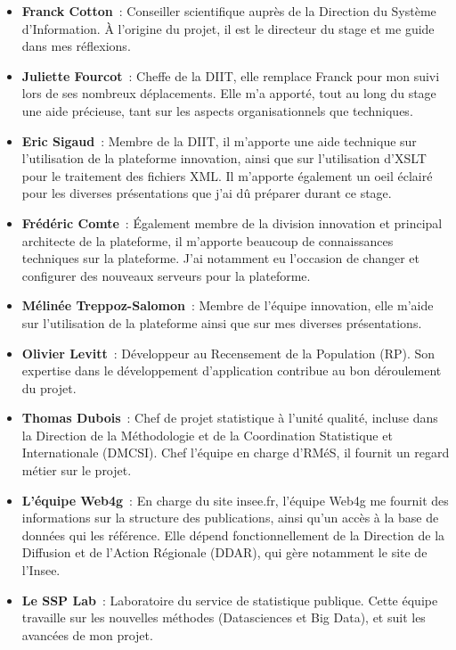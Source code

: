 \begin{itemize}
    \item \textbf{Franck Cotton}~: Conseiller scientifique auprès de la Direction du Système d'Information. À l'origine du projet, il est le directeur du stage et me guide dans mes réflexions.
    \vspace{5pt}
    \item \textbf{Juliette Fourcot}~: Cheffe de la DIIT, elle remplace Franck pour mon suivi lors de ses nombreux déplacements. Elle m'a apporté, tout au long du stage une aide précieuse, tant sur les aspects organisationnels que techniques.
    \vspace{5pt}
    \item \textbf{Eric Sigaud}~: Membre de la DIIT, il m'apporte une aide technique sur l'utilisation de la plateforme innovation, ainsi que sur l'utilisation d'XSLT pour le traitement des fichiers XML. Il m'apporte également un oeil éclairé pour les diverses présentations que j'ai dû préparer durant ce stage.
    \vspace{5pt}
    \item \textbf{Frédéric Comte}~: Également membre de la division innovation et principal architecte de la plateforme, il m'apporte beaucoup de connaissances techniques sur la plateforme. J'ai notamment eu l'occasion de changer et configurer des nouveaux serveurs pour la plateforme.
    \vspace{5pt}
    \item \textbf{Mélinée Treppoz-Salomon}~: Membre de l'équipe innovation, elle m'aide sur l'utilisation de la plateforme ainsi que sur mes diverses présentations.
    \vspace{5pt}
    \item \textbf{Olivier Levitt}~: Développeur au Recensement de la Population (RP). Son expertise dans le développement d'application contribue au bon déroulement du projet.
    \vspace{5pt}
    \item \textbf{Thomas Dubois}~: Chef de projet statistique à l'unité qualité, incluse dans la Direction de la Méthodologie et de la Coordination Statistique et Internationale (DMCSI). Chef l'équipe en charge d'RMéS, il fournit un regard métier sur le projet.
    \vspace{5pt}
    \item \textbf{L'équipe Web4g}~: En charge du site insee.fr, l'équipe Web4g me fournit des informations sur la structure des publications, ainsi qu'un accès à la base de données qui les référence. Elle dépend fonctionnellement de la Direction de la Diffusion et de l'Action Régionale (DDAR), qui gère notamment le site de l'Insee.
    \vspace{5pt}
    \item \textbf{Le SSP Lab}~: Laboratoire du service de statistique publique. Cette équipe travaille sur les nouvelles méthodes (Datasciences et Big Data), et suit les avancées de mon projet.
    \newline
\end{itemize}

